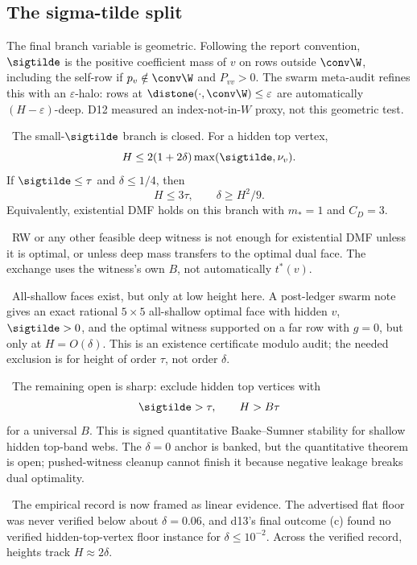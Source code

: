 \subsection{The sigma-tilde split}
The final branch variable is geometric.  Following the report convention, \(\sigtilde\) is
the positive coefficient mass of \(v\) on rows outside \(\conv\W\), including the self-row if
\(p_v\notin\conv\W\) and \(P_{vv}>0\).  The swarm meta-audit refines this with an
\(\varepsilon\)-halo: rows at \(\distone(\cdot,\conv\W)\le\varepsilon\) are automatically
\((H-\varepsilon)\)-deep.  D12 measured an index-not-in-\(W\) proxy, not this geometric test.
\begin{lemma}
\provedbadge\ The small-\(\sigtilde\) branch is closed.  For a hidden top vertex,
\[
  H\le2(1+2\delta)\max(\sigtilde,\nu_v).
\]
If \(\sigtilde\le\tau\) and \(\delta\le1/4\), then
\[
  H\le3\tau,\qquad \delta\ge H^2/9 .
\]
Equivalently, existential DMF holds on this branch with \(m_*=1\) and \(C_D=3\).
\end{lemma}
\begin{warning}
\downgradedbadge\ RW or any other feasible deep witness is not enough for existential DMF
unless it is optimal, or unless deep mass transfers to the optimal dual face.  The exchange
uses the witness's own \(B\), not automatically \(t^*(v)\).
\end{warning}
\begin{warning}
\modauditbadge\ All-shallow faces exist, but only at low height here.  A post-ledger
swarm note gives an exact rational \(5\times5\) all-shallow optimal face with hidden \(v\),
\(\sigtilde>0\), and the optimal witness supported on a far row with \(g=0\), but only at
\(H=O(\delta)\).  This is an existence certificate modulo audit; the needed exclusion is
for height of order \(\tau\), not order \(\delta\).
\end{warning}
\begin{openproblem}
\openbadge\ The remaining open is sharp: exclude hidden top vertices with
\[
  \sigtilde>\tau,\qquad H>B\tau
\]
for a universal \(B\).  This is signed quantitative Baake--Sumner stability for shallow
hidden top-band webs.  The \(\delta=0\) anchor is banked, but the quantitative theorem is
open; pushed-witness cleanup cannot finish it because negative leakage breaks dual
optimality.
\end{openproblem}
\begin{numericalresult}
\numbadge\ The empirical record is now framed as linear evidence.  The advertised flat floor
was never verified below about \(\delta=0.06\), and d13's final outcome (c) found no verified
hidden-top-vertex floor instance for \(\delta\le10^{-2}\).  Across the verified record,
heights track \(H\approx2\delta\).
\end{numericalresult}
